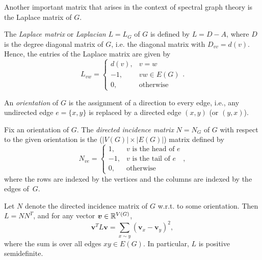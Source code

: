 Another important matrix that arises in the context of spectral graph theory is the Laplace matrix of $G$.
\begin{definition}
    The \textit{Laplace matrix} or \textit{Laplacian} $L = L_G$ of $G$ is defined by $L = D - A$, where $D$ is the degree diagonal matrix of $G$, i.e. the diagonal matrix with $D_{vv} = d(v)$. 
    Hence, the entries of the Laplace matrix are given by
    \begin{equation*}
        L_{vw} = \left\{\begin{array}{ll}
            d(v),& v = w \\
            -1, & vw \in E(G) \\
            0,& \text{otherwise}
        \end{array} \right. .
    \end{equation*}
\end{definition}

\begin{definition}
    An \textit{orientation} of $G$ is the assignment of a direction to every edge, i.e., any undirected edge $e = \{x, y \}$ is replaced by a directed edge $(x, y)$ (or $(y, x)$). 

    Fix an orientation of $G$. The \textit{directed incidence matrix} $N = N_G$ of $G$ with respect to the given orientation is the ($|V(G)| \times |E(G)|$) matrix defined by
    \begin{equation*}
        N_{ve} = \left\{\begin{array}{ll}
            1,& v \text{ is the head of } e \\
            -1, & v \text{ is the tail of } e \\
            0,& \text{otherwise}
        \end{array} \right. ,
    \end{equation*}
    where the rows are indexed by the vertices and the columns are indexed by the edges \mbox{of $G$}.
\end{definition}

\begin{proposition} \label{prop:laplacian-quadratic-form}
    Let $N$ denote the directed incidence matrix of $G$ w.r.t. to some orientation. 
    Then $L = N N^T$, and for any vector $\bm{v} \in \mathbb{R}^{V(G)}$,
    \begin{equation*}
        \bm{v}^T L \bm{v} = \sum \limits_{x \sim y} (\bm{v}_x - \bm{v}_y)^2,
    \end{equation*}
    where the sum is over all edges $xy \in E(G)$. 
    In particular, $L$ is positive semidefinite.
\end{proposition}

